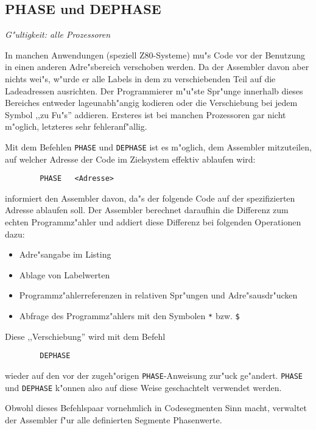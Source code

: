 \documentclass[12pt,a4paper,twoside]{report}
\makeatletter
\newcommand{\tty}[1]{{\tt #1}}
\newcommand{\ttindex}[1]{\index{#1@{\tt #1}}}
\makeatother
\begin{document}

\subsection{PHASE und DEPHASE}
\ttindex{PHASE}\ttindex{DEPHASE}

{\em G"ultigkeit: alle Prozessoren}

In manchen Anwendungen (speziell Z80-Systeme) mu"s Code vor der
Benutzung in einen anderen Adre"sbereich verschoben werden.  Da der
Assembler davon aber nichts wei"s, w"urde er alle Labels in dem zu
verschiebenden Teil auf die Ladeadressen ausrichten.  Der Programmierer
m"u"ste Spr"unge innerhalb dieses Bereiches entweder lageunabh"angig
kodieren oder die Verschiebung bei jedem Symbol ,,zu Fu"s'' addieren.
Ersteres ist bei manchen Prozessoren gar nicht m"oglich, letzteres sehr
fehleranf"allig.
\par
Mit dem Befehlen \tty{PHASE} und \tty{DEPHASE} ist es m"oglich, dem
Assembler mitzuteilen, auf welcher Adresse der Code im Zielsystem
effektiv ablaufen wird:
\begin{verbatim}
        PHASE   <Adresse>
\end{verbatim}
informiert den Assembler davon, da"s der folgende Code auf der
spezifizierten Adresse ablaufen soll.  Der Assembler berechnet
daraufhin die Differenz zum echten Programmz"ahler und addiert diese
Differenz bei folgenden Operationen dazu:
\begin{itemize}
\item{Adre"sangabe im Listing}
\item{Ablage von Labelwerten}
\item{Programmz"ahlerreferenzen in relativen Spr"ungen und
      Adre"sausdr"ucken}
\item{Abfrage des Programmz"ahlers mit den Symbolen \verb!*! bzw. \verb!$!}
\end{itemize}
Diese ,,Verschiebung'' wird mit dem Befehl
\begin{verbatim}
        DEPHASE
\end{verbatim}
wieder auf den vor der zugeh"origen \tty{PHASE}-Anweisung zur"uck ge"andert.
\tty{PHASE} und \tty{DEPHASE} k"onnen also auf diese Weise geschachtelt
verwendet werden.
\par
Obwohl dieses Befehlspaar vornehmlich in Codesegmenten Sinn macht,
verwaltet der Assembler f"ur alle definierten Segmente Phasenwerte.

\end{document}
